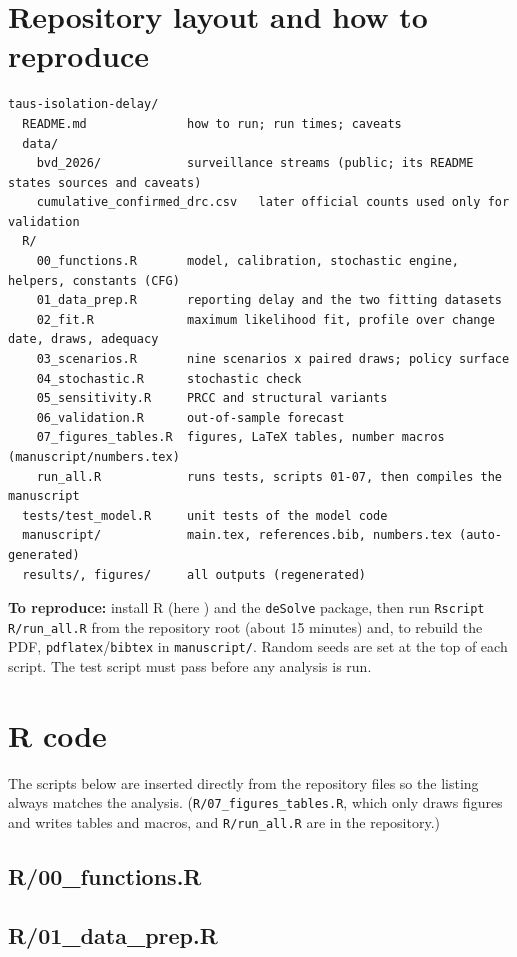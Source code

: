 \documentclass[11pt,a4paper]{article}
\begin{document}
\section{Repository layout and how to reproduce}\label{app:repro}
\small
\begin{verbatim}
taus-isolation-delay/
  README.md              how to run; run times; caveats
  data/
    bvd_2026/            surveillance streams (public; its README states sources and caveats)
    cumulative_confirmed_drc.csv   later official counts used only for validation
  R/
    00_functions.R       model, calibration, stochastic engine, helpers, constants (CFG)
    01_data_prep.R       reporting delay and the two fitting datasets
    02_fit.R             maximum likelihood fit, profile over change date, draws, adequacy
    03_scenarios.R       nine scenarios x paired draws; policy surface
    04_stochastic.R      stochastic check
    05_sensitivity.R     PRCC and structural variants
    06_validation.R      out-of-sample forecast
    07_figures_tables.R  figures, LaTeX tables, number macros (manuscript/numbers.tex)
    run_all.R            runs tests, scripts 01-07, then compiles the manuscript
  tests/test_model.R     unit tests of the model code
  manuscript/            main.tex, references.bib, numbers.tex (auto-generated)
  results/, figures/     all outputs (regenerated)
\end{verbatim}
\textbf{To reproduce:} install R (here \rVersion) and the \texttt{deSolve} package, then run \texttt{Rscript R/run\_all.R} from the repository root (about 15 minutes) and, to rebuild the PDF, \texttt{pdflatex}/\texttt{bibtex} in \texttt{manuscript/}. Random seeds are set at the top of each script. The test script must pass before any analysis is run.
\normalsize

\section{R code}\label{app:code}
The scripts below are inserted directly from the repository files so the listing always matches the analysis. (\texttt{R/07\_figures\_tables.R}, which only draws figures and writes tables and macros, and \texttt{R/run\_all.R} are in the repository.)
\subsection*{R/00\_functions.R}
\subsection*{R/01\_data\_prep.R}
\end{document}
